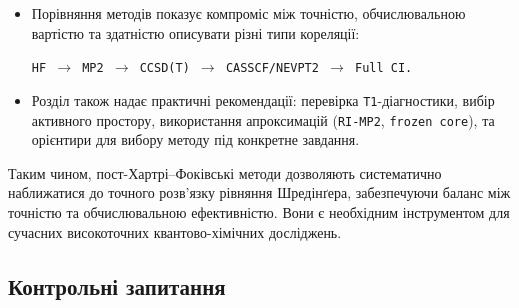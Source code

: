 \begin{itemize}
    \item Порівняння методів показує компроміс між точністю, обчислювальною вартістю
    та здатністю описувати різні типи кореляції:
    \begin{center}
        \texttt{HF $\rightarrow$ MP2 $\rightarrow$ CCSD(T) $\rightarrow$ CASSCF/NEVPT2 $\rightarrow$ Full CI.}
    \end{center}

    \item Розділ також надає практичні рекомендації:
    перевірка \texttt{T1}-діагностики, вибір активного простору,
    використання апроксимацій (\texttt{RI-MP2}, \texttt{frozen core}),
    та орієнтири для вибору методу під конкретне завдання.
\end{itemize}

Таким чином, пост-Хартрі--Фоківські методи дозволяють систематично
наближатися до точного розв’язку рівняння Шредінґера, забезпечуючи баланс
між точністю та обчислювальною ефективністю.
Вони є необхідним інструментом для сучасних високоточних квантово-хімічних досліджень.




\subsection*{Контрольні запитання}

